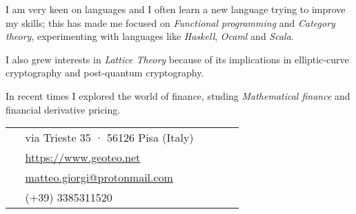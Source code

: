 \documentclass[10pt]{article} %
\begin{document}
\begin{paracol}{2}
I am very keen on languages and I often learn a new language trying to improve my skills; this has made me focused on \textit{Functional programming} and \textit{Category theory}, experimenting with languages like \textit{Haskell}, \textit{Ocaml} and \textit{Scala}.

\medskip
I also grew interests in \textit{Lattice Theory} because of its implications in elliptic-curve cryptography and post-quantum cryptography.

\medskip
In recent times I explored the world of finance, studing \textit{Mathematical finance} and financial derivative pricing.





\switchcolumn %


\parbox[top][0.12\textheight][c]{\linewidth}{ %
	\vspace{-0.04\textheight} %
	\colorbox{shade}{ %
		\begin{supertabular}{p{0.05\linewidth}|p{0.775\linewidth}} %
			\raisebox{-1pt}{\faHome} & via Trieste 35 · 56126 Pisa (Italy) \\ %
			\raisebox{-1pt}{\small\faDesktop} & \href{https://www.geoteo.net}{https://www.geoteo.net} \\ %
			\raisebox{0pt}{\small\faEnvelope} & \href{mailto:matteo.giorgi@protonmail.com}{matteo.giorgi@protonmail.com} \\ %
			\raisebox{-1pt}{\faPhoneSquare} & (+39) 3385311520 \\ %
		\end{supertabular}
	}
}


\end{paracol}
\end{document}

